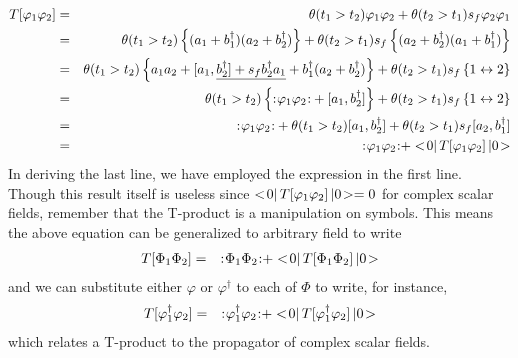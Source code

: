 \begin{eqnarray}
T[\varphi_1 \varphi_2] &=&
\theta(t_1 > t_2) \varphi_1 \varphi_2 + \theta(t_2 > t_1) s_f \varphi_2 \varphi_1
\nonumber\\
&=&
\theta(t_1 > t_2) \left\{ 
(a_1 + b_1^\dagger)(a_2 + b_2^\dagger) \right\}
+
\theta(t_2 > t_1) s_f  \left\{ 
(a_2 + b_2^\dagger) (a_1 + b_1^\dagger) \right\}
\nonumber\\
&=&
\theta(t_1 > t_2) \left\{ 
a_1 a_2 + [a_1, \underline{b_2^\dagger] + s_f   b_2^\dagger  a_1} + b_1^\dagger (a_2 + b_2^\dagger)
\right\}
+ 
\theta(t_2 > t_1) s_f  \left\{  1 \leftrightarrow 2 \right\}
\nonumber\\
&=&
\theta(t_1 > t_2) \left\{ 
{:\mathrel{\mspace{1mu}\varphi_1 \varphi_2\mspace{1mu}}:} + [a_1, b_2^\dagger]
\right\}
+ 
\theta(t_2 > t_1) s_f  \left\{  1 \leftrightarrow 2 \right\}
\nonumber\\
&=&
{:\mathrel{\mspace{1mu}\varphi_1 \varphi_2\mspace{1mu}}:}
+
\theta(t_1 > t_2) [a_1, b_2^\dagger]
+ 
\theta(t_2 > t_1) s_f  [a_2, b_1^\dagger]
\nonumber\\
&=&
{:\mathrel{\mspace{1mu}\varphi_1 \varphi_2\mspace{1mu}}:}
+
<\! 0 |\,
T[\varphi_1 \varphi_2]
\,| 0 \!>
\nonumber
\end{eqnarray}
In deriving the last line, we have employed the expression in the first line.
Though this result itself is useless since $<\! 0 |\,
T[\varphi_1 \varphi_2]
\,| 0 \!> = 0$
for complex scalar fields, remember that the T-product is a manipulation on symbols.
This means the above equation can be generalized to arbitrary field to write
\begin{eqnarray}
T[\Phi_1 \Phi_2] &=&
{:\mathrel{\mspace{1mu}\Phi_1 \Phi_2\mspace{1mu}}:}
+
<\! 0 |\,
T[\Phi_1 \Phi_2]
\,| 0 \!>
\label{eqn:Tprodphiphi}
\end{eqnarray}
and we can substitute either $\varphi$ or $\varphi^\dagger$ to each of $\Phi$
to write, for instance,
\begin{eqnarray*}
T[\varphi_1^\dagger \varphi_2] &=&
{:\mathrel{\mspace{1mu}\varphi_1^\dagger \varphi_2\mspace{1mu}}:}
+
<\! 0 |\,
T[\varphi_1^\dagger \varphi_2]
\,| 0 \!>
\end{eqnarray*}
which relates a T-product to the propagator of complex scalar fields.

